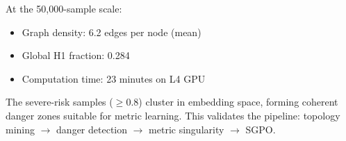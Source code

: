 \documentclass{article}
\begin{document}
At the 50,000-sample scale:
\begin{itemize}
    \item Graph density: 6.2 edges per node (mean)
    \item Global H1 fraction: 0.284
    \item Computation time: 23 minutes on L4 GPU
\end{itemize}

The severe-risk samples ($\geq 0.8$) cluster in embedding space, forming coherent danger zones suitable for metric learning. This validates the pipeline: topology mining $\to$ danger detection $\to$ metric singularity $\to$ SGPO.
\end{document}
